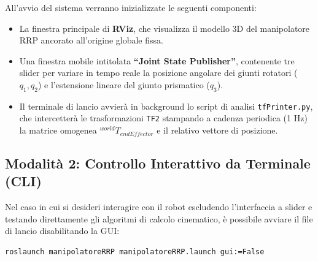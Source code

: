 \documentclass[11pt, a4paper]{report}
\begin{document}
All'avvio del sistema verranno inizializzate le seguenti componenti:
\begin{itemize}
    \item La finestra principale di \textbf{RViz}, che visualizza il modello 3D del manipolatore RRP ancorato all'origine globale fissa.
    \item Una finestra mobile intitolata \textbf{``Joint State Publisher''}, contenente tre slider per variare in tempo reale la posizione angolare dei giunti rotatori (\(q_1, q_2\)) e l'estensione lineare del giunto prismatico (\(q_3\)).
    \item Il terminale di lancio avvierà in background lo script di analisi \texttt{tfPrinter.py}, che intercetterà le trasformazioni \texttt{TF2} stampando a cadenza periodica (1 Hz) la matrice omogenea \(^{world}T_{endEffector}\) e il relativo vettore di posizione.
\end{itemize}

\subsection{Modalità 2: Controllo Interattivo da Terminale (CLI)}
Nel caso in cui si desideri interagire con il robot escludendo l'interfaccia a slider e testando direttamente gli algoritmi di calcolo cinematico, è possibile avviare il file di lancio disabilitando la GUI:
\begin{lstlisting}[language=bash]
roslaunch manipolatoreRRP manipolatoreRRP.launch gui:=False
\end{lstlisting}
\end{document}
